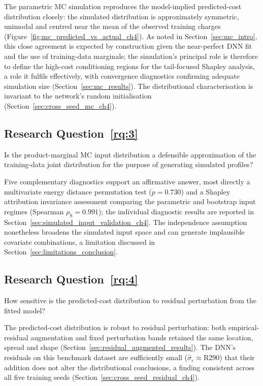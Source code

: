 The parametric MC simulation reproduces the model-implied
predicted-cost distribution closely: the simulated distribution is
approximately symmetric, unimodal and centred near the mean of the
observed training charges
(Figure~\ref{fig:mc_predicted_vs_actual_ch4}).  As noted in
Section~\ref{sec:mc_intro}, this close agreement is expected by
construction given the near-perfect DNN fit and the use of
training-data marginals; the simulation's principal role is therefore
to define the high-cost conditioning regions for the tail-focused
Shapley analysis, a role it fulfils effectively, with convergence
diagnostics confirming adequate simulation size
(Section~\ref{sec:mc_results}).  The distributional characterisation is
invariant to the network's random initialisation
(Section~\ref{sec:cross_seed_mc_ch4}).

\subsection{Research Question~\ref{rq:3}}
Is the product-marginal MC input distribution a
defensible approximation of the training-data joint distribution for the
purpose of generating simulated profiles?

Five complementary diagnostics support an affirmative answer, most
directly a multivariate energy distance permutation test ($p = 0.730$)
and a Shapley attribution invariance assessment comparing the
parametric and bootstrap input regimes (Spearman
$\rho_{\mathrm{S}} = 0.991$); the individual diagnostic results are
reported in Section~\ref{sec:simulated_input_validation_ch4}.  The
independence assumption nonetheless broadens the simulated input space
and can generate implausible covariate combinations, a limitation
discussed in Section~\ref{sec:limitations_conclusion}.

\subsection{Research Question~\ref{rq:4}}
How sensitive is the predicted-cost distribution to residual
perturbation from the fitted model?

The predicted-cost distribution is robust to residual perturbation:
both empirical-residual augmentation and fixed perturbation bands
retained the same location, spread and shape
(Section~\ref{sec:residual_augmented_results}).  The DNN's
residuals on this benchmark dataset are sufficiently small
($\hat{\sigma}_{\varepsilon} \approx \text{R}290$) that their addition
does not alter the distributional conclusions, a finding consistent
across all five training seeds
(Section~\ref{sec:cross_seed_residual_ch4}).

